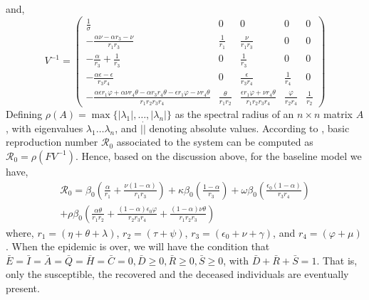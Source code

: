 \documentclass[10pt]{wlscirep}
\begin{document}
%
%
and,
%
%
\begin{equation}
V^{-1} = 
\begin{pmatrix}
\frac{1}{\sigma} & 0 & 0 & 0 & 0\\
- \frac{\alpha \nu - \alpha r_{3} - \nu}{r_{1} r_{3}} & \frac{1}{r_{1}} & \frac{\nu}{r_{1} r_{3}} & 0 & 0\\
- \frac{\alpha}{r_{3}} + \frac{1}{r_{3}} & 0 & \frac{1}{r_{3}} & 0 & 0\\
- \frac{\alpha \epsilon - \epsilon}{r_{3} r_{4}} & 0 & \frac{\epsilon}{r_{3} r_{4}} & \frac{1}{r_{4}} & 0\\
- \frac{\alpha \epsilon r_{1} \varphi + \alpha \nu r_{4} \theta - \alpha r_{3} r_{4} \theta - \epsilon r_{1} \varphi - \nu r_{4} \theta}{r_{1} r_{2} r_{3} r_{4}} & \frac{\theta}{r_{1} r_{2}} & \frac{\epsilon r_{1} \varphi + \nu r_{4} \theta}{r_{1} r_{2} r_{3} r_{4}} & \frac{\varphi}{r_{2} r_{4}} & \frac{1}{r_{2}}
\end{pmatrix}
\nonumber
\label{eqn:DFE-5}
\end{equation}
%
%
Defining $\rho(A) = \max {\{ | \lambda_1 |, \ldots,  | \lambda_n |\} }$ as the spectral radius of an $n \times n$ matrix $A$, with eigenvalues $\lambda_1 \ldots \lambda_n$, and $|\dot|$ denoting absolute values. According to \cite{VANDENDRIESSCHE200229}, basic reproduction number $\mathcal{R}_0$ associated to the system can be computed as $\mathcal{R}_0 = \rho(FV^{-1})$. Hence, based on the discussion above, for the baseline model we have,
%
%
\begin{equation}
\begin{split}
\mathcal{R}_0 =  \beta_0 \left( \frac{\alpha}{r_1} + \frac{\nu \left(1-\alpha \right) }{r_1 r_3}\right) + \kappa \beta_0 \left( \frac{1-\alpha}{r_3} \right) + \omega \beta_0 \left( \frac{\epsilon_0 \left( 1-\alpha\right) }{r_3 r_4}\right) \\
+ \rho \beta_0 \left( \frac{\alpha \theta}{r_1 r_2} + \frac{\left( 1-\alpha\right) \epsilon_0 \varphi}{r_2 r_3 r_4} + \frac{\left( 1-\alpha\right) \nu \theta}{r_1 r_2 r_3}\right) 
\end{split}
\label{eqn:Rnot}
\end{equation}
%
%
where, $r_1 = \left( \eta + \theta + \lambda \right) $, $r_2 = \left( \tau + \psi \right) $, $r_3 = \left( \epsilon_0 + \nu + \gamma\right) $, and $r_4 =  \left( \varphi + \mu\right)$.
%
%
When the epidemic is over, we will have the condition that $\bar{E}=\bar{I}=\bar{A}=\bar{Q}=\bar{H}=\bar{C}=0,  \bar{D}\geq 0, \bar{R}\geq 0, \bar{S}\geq 0$, with $\bar{D} + \bar{R} + \bar{S} = 1$. That is, only the susceptible, the recovered and the deceased individuals are eventually present.
\end{document}
